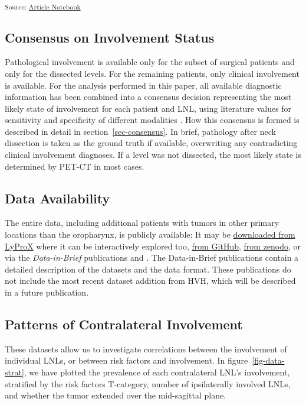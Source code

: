 \documentclass[
  sn-mathphys-num,
]{sn-jnl}
\begin{document}
\textsubscript{Source:
\href{https://rmnldwg.github.io/bilateral-paper/manuscript-preview.html}{Article
Notebook}}

\subsection{Consensus on Involvement Status}\label{sec-data-consensus}

Pathological involvement is available only for the subset of surgical
patients and only for the dissected levels. For the remaining patients,
only clinical involvement is available. For the analysis performed in
this paper, all available diagnostic information has been combined into
a consensus decision representing the most likely state of involvement
for each patient and LNL, using literature values for sensitivity and
specificity of different modalities
\citep{de_bondt_detection_2007, kyzas_18f-fluorodeoxyglucose_2008}. How
this consensus is formed is described in detail in
section~\ref{sec-consensus}. In brief, pathology after neck dissection
is taken as the ground truth if available, overwriting any contradicting
clinical involvement diagnoses. If a level was not dissected, the most
likely state is determined by PET-CT in most cases.

\subsection{Data Availability}\label{data-availability}

The entire data, including additional patients with tumors in other
primary locations than the oropharynx, is publicly available: It may be
\href{https://lyprox.org/patients/dataset}{downloaded from LyProX} where
it can be interactively explored too,
\href{https://github.com/rmnldwg/lydata}{from GitHub},
\href{https://zenodo.org/search?q=lydata}{from zenodo}, or via the
\emph{Data-in-Brief} publications \citet{ludwig_dataset_2022} and
\citet{ludwig_multi-centric_2023}. The Data-in-Brief publications
contain a detailed description of the datasets and the data format.
These publications do not include the most recent dataset addition from
HVH, which will be described in a future publication.

\subsection{Patterns of Contralateral Involvement}\label{sec-data-strat}

These datasets allow us to investigate correlations between the
involvement of individual LNLs, or between risk factors and involvement.
In figure~\ref{fig-data-strat}, we have plotted the prevalence of each
contralateral LNL's involvement, stratified by the risk factors
T-category, number of ipsilaterally involved LNLs, and whether the tumor
extended over the mid-sagittal plane.
\end{document}
